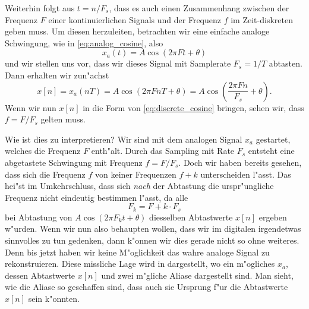 Weiterhin folgt aus $t = n/F_s$, dass es auch einen Zusammenhang zwischen der Frequenz $F$ einer kontinuierlichen Signals und der Frequenz $f$ im Zeit-diskreten geben muss.
Um diesen herzuleiten, betrachten wir eine einfache analoge Schwingung, wie in \eqref{eq:analog_cosine}, also
\[
x_a(t) = A \cos(2 \pi F t + \theta)
\]
und wir stellen uns vor, dass wir dieses Signal mit Samplerate $F_s = 1/T$ abtasten. Dann erhalten wir zun"achst
\[
x[n] 
    = x_a(n T) 
    = A \cos(2 \pi F n T + \theta) 
    = A \cos\left(\frac{2 \pi F n}{F_s} + \theta\right).
\]
Wenn wir nun $x[n]$ in die Form von \eqref{eq:discrete_cosine} bringen, sehen wir, dass $f = F/F_s$ gelten muss.

Wie ist dies zu interpretieren? 
Wir sind mit dem analogen Signal $x_a$ gestartet, welches die Frequenz $F$ enth"alt.
Durch das Sampling mit Rate $F_s$ entsteht eine abgetastete Schwingung mit Frequenz $f = F/F_s$. 
Doch wir haben bereits gesehen, dass sich die Frequenz $f$ von keiner Frequenzen $f + k$ unterscheiden l"asst.
Das hei"st im Umkehrschluss, dass sich \emph{nach} der Abtastung die urspr"ungliche Frequenz nicht eindeutig bestimmen l"asst, da alle
\[
F_k = F + k \cdot F_s 
\]
bei Abtastung von $A \cos(2 \pi F_k t + \theta)$ diesselben Abtastwerte $x[n]$ ergeben w"urden.
Wenn wir nun also behaupten wollen, dass wir im digitalen irgendetwas sinnvolles zu tun gedenken, dann k"onnen wir dies gerade nicht so ohne weiteres.
Denn bis jetzt haben wir keine M"oglichkeit das wahre analoge Signal zu rekonstruieren.
Diese missliche Lage wird in  dargestellt, wo ein m"ogliches $x_a$, dessen Abtastwerte $x[n]$ und zwei m"gliche Aliase dargestellt sind.
Man sieht, wie die Aliase so geschaffen sind, dass auch sie Ursprung f"ur die Abtastwerte $x[n]$ sein k"onnten.
%
